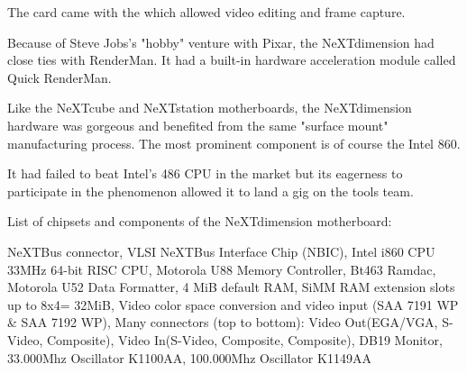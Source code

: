 \par
\par
The card came with the  which allowed video editing and frame capture.
\par
\vspace{5pt}
\par
Because of Steve Jobs's "hobby" venture with Pixar, the NeXTdimension had close ties with RenderMan. It had a built-in hardware acceleration module called Quick RenderMan.\\
\par
\par






\par
Like the NeXTcube and NeXTstation motherboards, the NeXTdimension hardware was gorgeous and benefited from the same "surface mount" manufacturing process. The most prominent component is of course the Intel 860.\\
\par It had failed to beat Intel's 486 CPU in the market but its eagerness to participate in the \doom{} phenomenon allowed it to land a gig on the tools team.\\
\par
{}
\par
{}
\par
List of chipsets and components of the NeXTdimension motherboard:\\
\par 
{} NeXTBus connector,
 VLSI NeXTBus Interface Chip (NBIC),
 Intel i860 CPU 33MHz 64-bit RISC CPU,
 Motorola U88 Memory Controller,
 Bt463 Ramdac,
 Motorola U52 Data Formatter,
 4 MiB default RAM,
 SiMM RAM extension slots up to 8x4= 32MiB,
 Video color space conversion and video input (SAA 7191 WP \& SAA 7192 WP), 
 Many connectors (top to bottom): Video Out(EGA/VGA, S-Video, Composite), Video In(S-Video, Composite, Composite), DB19 Monitor,
 33.000Mhz Oscillator K1100AA,
 100.000Mhz Oscillator K1149AA
\par

